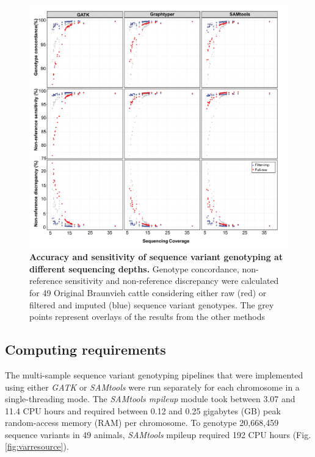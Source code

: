 \documentclass[../main.tex]{subfiles}
\begin{document}
\begin{figure}[!htb]
    \centering
    \includegraphics[width=\textwidth]{paper1/main_figure/Figure3.pdf}
    \caption{\textbf{Accuracy and sensitivity of sequence variant genotyping at different sequencing depths.} Genotype concordance, non-reference sensitivity and non-reference discrepancy were calculated for 49 Original Braunvieh cattle considering either raw (red) or filtered and imputed (blue) sequence variant genotypes. The grey points represent overlays of the results from the other methods}
    \label{fig:varimpute}
\end{figure}

\subsection*{Computing requirements}

The multi-sample sequence variant genotyping pipelines that were implemented using either \emph{GATK} or \emph{SAMtools} were run separately for each chromosome in a single-threading mode. 
The \emph{SAMtools mpileup} module took between 3.07 and 11.4 CPU hours and required between 0.12 and 0.25 gigabytes (GB) peak random-access memory (RAM) per chromosome. 
To genotype 20,668,459 sequence variants in 49 animals, \emph{SAMtools} mpileup required 192 CPU hours (Fig. \ref{fig:varresource}).
\end{document}
